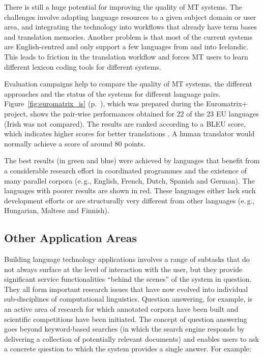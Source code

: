 \begin{multicols}{2}
There is still a huge potential for improving the quality of MT systems. The challenges involve adapting language resources to a given subject domain or user area, and integrating the technology into workflows that already have term bases and translation memories. Another problem is that most of the current systems are English-centred and only support a few languages from and into Icelandic. This leads to friction in the translation workflow and forces MT users to learn different lexicon coding tools for different systems.

Evaluation campaigns help to compare the quality of MT systems, the different approaches and the status of the systems for different language pairs. Figure~\ref{fig:euromatrix_is} (p.~\pageref{fig:euromatrix_is}), which was prepared during the Euromatrix+ project, shows the pair-wise performances obtained for 22 of the 23 EU languages (Irish was not compared). The results are ranked according to a BLEU score, which indicates higher scores for better translations \cite{bleu1}. A human translator would normally achieve a score of around 80 points.

The best results (in green and blue) were achieved by languages that benefit from a considerable research effort in coordinated programmes and the existence of many parallel corpora (e.\,g., English, French, Dutch, Spanish and German). The languages with poorer results are shown in red. These languages either lack such development efforts or are structurally very different from other languages (e.\,g., Hungarian, Maltese and Finnish).

\subsection{Other Application Areas}

Building language technology applications involves a range of subtasks that do not always surface at the level of interaction with the user, but they provide significant service functionalities “behind the scenes” of the system in question. They all form important research issues that have now evolved into individual sub-disciplines of computational linguistics.  Question answering, for example, is an active area of research for which annotated corpora have been built and scientific competitions have been initiated. The concept of question answering goes beyond keyword-based searches (in which the search engine responds by delivering a collection of potentially relevant documents) and enables users to ask a concrete question to which the system provides a single answer. For example:


\end{multicols}
